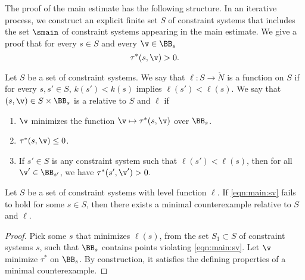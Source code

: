 The proof of the main estimate has the following structure.  In an
iterative process, we construct an explicit finite set $S$ of
constraint systems that includes the set $\smain$ of constraint
systems appearing in the main estimate.   We give a proof that for
every $s\in S$ and every $\v\in \BB_s$
\begin{equation}\label{eqn:main:sv}
\tau^*(s,\v)> 0.
\end{equation}

%
\begin{definition}
  Let $S$ be a set of constraint systems.  We say that $\ell:S\to\ring{N}$ 
  is a  function
on $S$ if for every $s,s'\in S$, $k(s')<k(s)$ implies  $\ell(s')<\ell(s)$. 
 We say that
  $(s,\v)\in S\times\BB_s$ is a   relative to $S$ and $\ell$ if
\begin{enumerate}
\item $\v$ minimizes the function $\v\mapsto\tau^*(s,\v)$ over $\BB_s$.
\item  $\tau^*(s,\v)\le 0$.
\item If $s'\in S$ is any constraint system such that $\ell(s')<\ell(s)$, then
for all $\v'\in \BB_{s'}$, we have $\tau^*(s',\v')>0$.
\end{enumerate}
\end{definition}

\begin{lemma}
Let $S$ be a set of constraint systems with level function $\ell$.
If \eqref{eqn:main:sv} fails to hold for some $s\in S$, 
then there exists a minimal counterexample relative to $S$ and $\ell$.
\end{lemma}

\begin{proof}
  Pick some $s$ that minimizes $\ell(s)$, from the set $S_1\subset S$ of
  constraint systems $s$, such that $\BB_s$ contains points violating
  \eqref{eqn:main:sv}.  Let $\v$ minimize $\tau^*$ on $\BB_s$.  By
  construction, it satisfies the  defining properties of a
  minimal counterexample.  
\end{proof}

